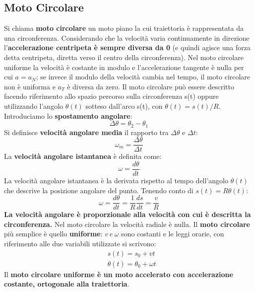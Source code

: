 \documentclass{article}
\numberwithin{equation}{subsection}
\begin{document}
\subsection{Moto Circolare}
Si chiama \textbf{moto circolare} un moto piano la cui traiettoria è rappresentata da una circonferenza. Considerando che la velocità varia continuamente in direzione l'\textbf{accelerazione centripeta è sempre diversa da 0} (e quindi agisce una forza detta centripeta, diretta verso il centro della circonferenza). Nel moto circolare uniforme la velocità è costante in modulo e l'accelerazione tangente è nulla per cui $a=a_N$; se invece il modulo della velocità cambia nel tempo, il moto circolare non è uniforma e $a_T$ è diversa da zero. Il moto circolare può essere descritto facendo riferimento allo spazio percorso sulla circonferenza s(t) oppure utilizzando l'angolo $\theta (t)$ sotteso dall'arco s(t), con $\theta (t)= s(t)/R$. Introduciamo lo \textbf{spostamento angolare}:
\begin{equation}
    \Delta \theta= \theta_2 - \theta_1
\end{equation}
  Si definisce \textbf{velocità angolare media} il rapporto tra $\Delta \theta $ e $\Delta t$:
  \begin{equation}
      \omega_m=\frac{\Delta \theta}{\Delta t}
  \end{equation}
  La \textbf{velocità angolare istantanea} è definita come:
  \begin{equation}
      \omega=\frac{d \theta}{dt}
  \end{equation}
  La velocità angolare istantanea è la derivata rispetto al tempo dell'angolo $\theta (t)$ che descrive la posizione angolare del punto. Tenendo conto di $s(t)= R \theta(t)$:
  \begin{equation}
      \omega = \frac{d \theta}{dt}= \frac{1}{R}\frac{ds}{dt}=\frac{v}{R}
  \end{equation}
  \textbf{La velocità angolare è proporzionale alla velocità con cui è descritta la circonferenza.} Nel moto circolare la velocità radiale è nulla. Il \textbf{moto circolare} più semplice è quello \textbf{uniforme}: $v \ e \ \omega$ sono costanti e le leggi orarie, con riferimento alle due variabili utilizzate si scrivono:
  \begin{align}
      & s(t)=s_0 + vt \\
      & \theta(t)= \theta_0 + \omega t
  \end{align}
  Il \textbf{moto circolare uniforme è un moto accelerato con accelerazione costante, ortogonale alla traiettoria}.
\end{document}
